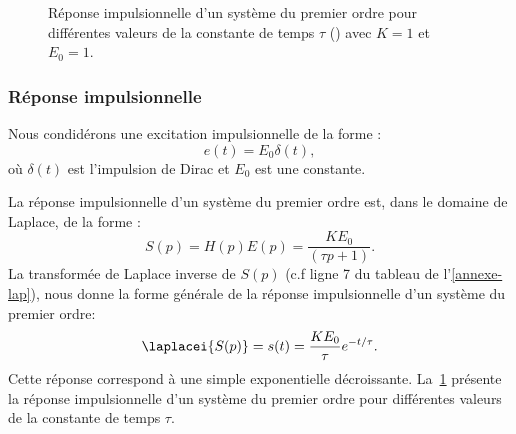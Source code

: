 \begin{figure}[!t]
\begin{center}
\caption{Réponse impulsionnelle d'un système du premier ordre pour différentes valeurs
    de la constante de temps $\tau$  () avec $K=1$ et $E_0=1$.\label{fig-1er_imp}}
\end{center}
\end{figure}

\subsubsection{Réponse impulsionnelle}
Nous condidérons une excitation impulsionnelle de la forme :
$$
e(t)=E_0\delta(t),
$$
où $\delta(t)$ est l'impulsion de Dirac et $E_0$ est une constante.

La réponse impulsionnelle d'un système du premier ordre est, dans le domaine de Laplace,
de la forme :
$$
S(p)=H(p)E(p)=\dfrac{KE_0}{(\tau p+1)}.
$$
La transformée de Laplace inverse de $S(p)$ (c.f ligne 7 du tableau de l'\cref{annexe-lap}),
nous donne la forme générale de la réponse impulsionnelle d'un système du premier ordre:
\begin{align}
    \laplacei{S(p)}=s(t)=\dfrac{KE_0}{\tau} e^{-t/\tau}\label{eq-1er_imp}.
\end{align}
Cette réponse correspond à une simple exponentielle décroissante.
La~\cref{fig-1er_imp} présente la réponse impulsionnelle d'un système du premier ordre pour
différentes valeurs de la constante de temps $\tau$.

